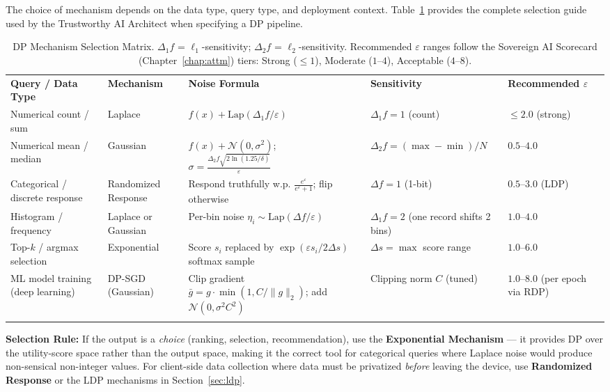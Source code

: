 The choice of mechanism depends on the data type, query type, and deployment context. Table~\ref{tab:dp_mechanism_matrix} provides the complete selection guide used by the Trustworthy AI Architect when specifying a DP pipeline.

\begin{table}[ht]
\centering
\caption{DP Mechanism Selection Matrix. $\Delta_1 f$ = $\ell_1$-sensitivity; $\Delta_2 f$ = $\ell_2$-sensitivity. Recommended $\varepsilon$ ranges follow the Sovereign AI Scorecard (Chapter~\ref{chap:attm}) tiers: Strong ($\leq 1$), Moderate ($1$--$4$), Acceptable ($4$--$8$).}
\label{tab:dp_mechanism_matrix}
\renewcommand{\arraystretch}{1.3}
\begin{tabular}{p{2.0cm} p{2.2cm} p{2.8cm} p{2.4cm} p{3.0cm}}
\hline\noalign{\smallskip}
\textbf{Query / Data Type} & \textbf{Mechanism} & \textbf{Noise Formula} & \textbf{Sensitivity} & \textbf{Recommended $\varepsilon$} \\
\noalign{\smallskip}\svhline\noalign{\smallskip}
Numerical count / sum & Laplace & $f(x) + \mathrm{Lap}(\Delta_1 f / \varepsilon)$ & $\Delta_1 f = 1$ (count) & $\leq 2.0$ (strong) \\[3pt]
Numerical mean / median & Gaussian & $f(x) + \mathcal{N}(0, \sigma^2)$; $\sigma = \frac{\Delta_2 f \sqrt{2\ln(1.25/\delta)}}{\varepsilon}$ & $\Delta_2 f = (\max - \min)/N$ & $0.5$--$4.0$ \\[3pt]
Categorical / discrete response & Randomized Response & Respond truthfully w.p. $\frac{e^\varepsilon}{e^\varepsilon + 1}$; flip otherwise & $\Delta f = 1$ (1-bit) & $0.5$--$3.0$ (LDP) \\[3pt]
Histogram / frequency & Laplace or Gaussian & Per-bin noise $\eta_i \sim \mathrm{Lap}(\Delta f / \varepsilon)$ & $\Delta_1 f = 2$ (one record shifts 2 bins) & $1.0$--$4.0$ \\[3pt]
Top-$k$ / argmax selection & Exponential & Score $s_i$ replaced by $\exp(\varepsilon s_i / 2\Delta s)$ softmax sample & $\Delta s = \max$ score range & $1.0$--$6.0$ \\[3pt]
ML model training (deep learning) & DP-SGD (Gaussian) & Clip gradient $\bar{g} = g \cdot \min(1, C/\|g\|_2)$; add $\mathcal{N}(0, \sigma^2 C^2)$ & Clipping norm $C$ (tuned) & $1.0$--$8.0$ (per epoch via RDP) \\
\noalign{\smallskip}\hline\noalign{\smallskip}
\end{tabular}
\end{table}

\begin{svgraybox}
\textbf{Selection Rule:} If the output is a \emph{choice} (ranking, selection, recommendation), use the \textbf{Exponential Mechanism} --- it provides DP over the utility-score space rather than the output space, making it the correct tool for categorical queries where Laplace noise would produce non-sensical non-integer values. For client-side data collection where data must be privatized \emph{before} leaving the device, use \textbf{Randomized Response} or the LDP mechanisms in Section~\ref{sec:ldp}.
\end{svgraybox}

